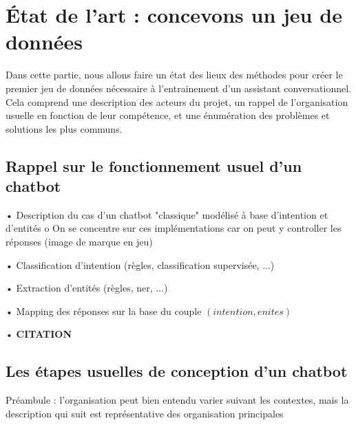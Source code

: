 \chapter{État de l'art : concevons un jeu de données}
    \label{chapter:1-ETAT-DE-L-ART}

    Dans cette partie, nous allons faire un état des lieux des méthodes pour créer le premier jeu de données nécessaire à l'entrainement d'un assistant conversationnel.
    Cela comprend une description des acteurs du projet, un rappel de l'organisation usuelle en fonction de leur compétence, et une énumération des problèmes et solutions les plus communs.

    \minitoc

    \section{Rappel sur le fonctionnement usuel d'un chatbot}

        •	Description du cas d'un chatbot  "classique" modélisé à base d'intention et d'entités
            o	 On se concentre sur ces implémentations car on peut y controller les réponses (image de marque en jeu)

        •	Classification  d'intention (règles, classification supervisée, ...)

        •	Extraction d'entités  (règles, ner, ...)

        •	Mapping des réponses sur la base du couple $(intention, enites)$

        •	\textbf{CITATION}

    \section{Les étapes usuelles de conception d'un chatbot}

        Préambule : l'organisation peut bien entendu varier suivant les contextes, mais la description qui suit est représentative des organisation principales

